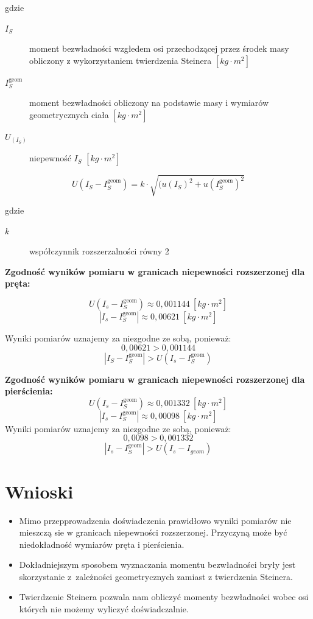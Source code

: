 \documentclass[a4paper,11pt]{article}
\begin{document}
gdzie 
\begin{description}
\item [$I_{S}$] moment bezwładności wzgłedem osi przechodzącej przez środek masy obliczony z wykorzystaniem twierdzenia Steinera $\left[kg \cdot m^{2} \right]$
\item [$I_{S}^{\text{geom}}$] moment bezwładności obliczony na podstawie masy i wymiarów geometrycznych ciała $\left[kg \cdot m^{2} \right]$
\item [$U_(I_{S})$] niepewność $I_{S}$ $\left[kg \cdot m^{2} \right]$
\end{description}

\begin{equation}
U(I_{S} - I_{S}^{\text{geom}}) = k \cdot \sqrt{(u(I_{S})^2 + u(I_{S}^{\text{geom}})^2}
\end{equation}

gdzie 
\begin{description}
\item [$k$] współczynnik rozszerzalności równy 2
\end{description} 

\textbf{Zgodność wyników pomiaru w granicach niepewności rozszerzonej dla pręta:}

$$U(I_{s} - I_{S}^{\text{geom}}) \approx 0,001144~[kg \cdot m^2]$$
$$\left|I_{s} - I_{S}^{\text{geom}}\right| \approx 0,00621 ~[kg \cdot m^2]$$

Wyniki pomiarów uznajemy za niezgodne ze sobą, ponieważ: 
$$0,00621 > 0,001144 $$
$$\left|I_{S} - I_{S}^{\text{geom}}\right| > U(I_{s} - I_{S}^{\text{geom}})$$

\textbf{Zgodność wyników pomiaru w granicach niepewności rozszerzonej dla pierścienia:}
$$U(I_{s} - I_{S}^{\text{geom}}) \approx 0,001332 ~[kg \cdot m^2]$$
$$\left|I_{s} - I_{S}^{\text{geom}}\right| \approx 0,00098~[kg \cdot m^2]$$
Wyniki pomiarów uznajemy za niezgodne ze sobą, ponieważ: 
$$ 0,0098 > 0,001332 $$
$$\left|I_{s} - I_{S}^{\text{geom}}\right| > U(I_{s} - I_{geom})$$

\section{Wnioski}
\begin{itemize}
\item Mimo przepprowadzenia doświadczenia prawidłowo wyniki pomiarów nie mieszczą sie w granicach niepewności rozszerzonej. Przyczyną może być niedokładność wymiarów pręta i pierścienia.
\item Dokładniejszym sposobem wyznaczania momentu bezwładności bryły jest skorzystanie z~zależności geometrycznych zamiast z twierdzenia Steinera.
\item Twierdzenie Steinera pozwala nam obliczyć momenty bezwładności wobec osi których nie możemy wyliczyć doświadczalnie.

\end{itemize}
\end{document}
